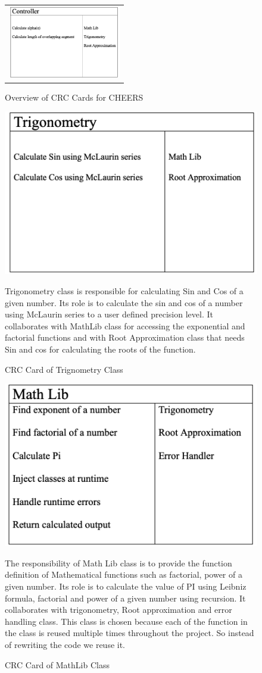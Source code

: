 \begin{figure}[h!]
        \begin{tabular}{@{}c@{}}
          \includegraphics[width=.4\linewidth,height=90pt]{resources/Controller.png}
        \end{tabular}

        \vspace{\floatsep}
      \caption{Overview of CRC Cards for CHEERS}\label{fig:myfig}
  \end{figure}
  \newpage
  \begin{figure}
    \centering
    \includegraphics[width=.5\linewidth]{resources/Trigonometry.png}
    \caption{CRC Card of Trignometry Class}\label{fig:trignometry}
    \parbox{1.0\linewidth}{
      Trigonometry class is responsible for calculating Sin and Cos of a given number. Its role is to calculate the sin and cos of a number using McLaurin series to a user defined precision level. It collaborates with MathLib class for accessing the exponential and factorial functions and with Root Approximation class that needs Sin and cos for calculating the roots of the function.
    }
  \end{figure} 
  \begin{figure}
    \centering
    \includegraphics[width=.5\linewidth]{resources/MathLib.png}
    \caption{CRC Card of MathLib Class}\label{fig:mathlib}

    \parbox{1.0\linewidth}{
      The responsibility of Math Lib class is to provide the function definition of Mathematical functions such as factorial, power of a given number. Its role is to calculate the value of PI using Leibniz formula, factorial and power of a given number using recursion. It collaborates with trigonometry, Root approximation and error handling class. This class is chosen because each of the function in the class is reused multiple times throughout the project. So instead of rewriting the code we reuse it.

    }
  \end{figure}
